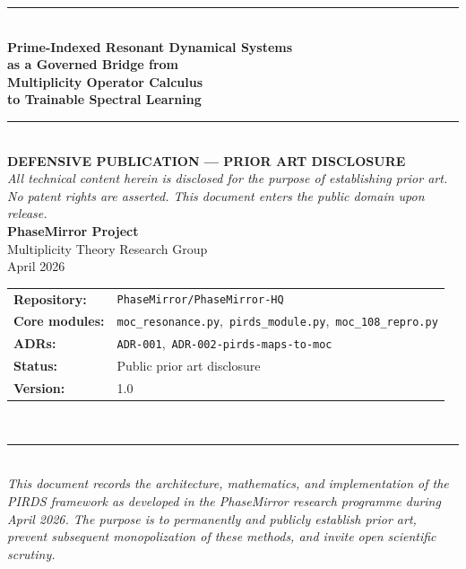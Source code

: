 \documentclass[11pt,a4paper]{article}
\theoremstyle{plain}
\theoremstyle{definition}
\theoremstyle{remark}
\begin{document}

\begin{titlepage}
\pagecolor{bg}
\vspace*{2cm}
\begin{center}
  {\color{teal}\rule{0.9\textwidth}{2pt}}\\[1.2em]
  {\fontsize{22}{28}\selectfont\bfseries\color{stone}
    Prime-Indexed Resonant Dynamical Systems\\[0.4em]
    as a Governed Bridge from\\[0.4em]
    Multiplicity Operator Calculus\\[0.4em]
    to Trainable Spectral Learning}\\[1.0em]
  {\color{teal}\rule{0.9\textwidth}{2pt}}\\[2.0em]
  {\large\bfseries\color{muted} DEFENSIVE PUBLICATION --- PRIOR ART DISCLOSURE}\\[0.5em]
  {\normalsize\color{muted}
    \textit{All technical content herein is disclosed for the purpose of establishing prior art.}\\
    \textit{No patent rights are asserted. This document enters the public domain upon release.}}
  \\[2.5em]
  {\large\bfseries\color{stone} PhaseMirror Project}\\[0.3em]
  {\normalsize\color{muted} Multiplicity Theory Research Group}\\[0.3em]
  {\normalsize\color{muted} April 2026}\\[3.5em]
  \begin{tabular}{ll}
    \textbf{Repository:} & \texttt{PhaseMirror/PhaseMirror-HQ}\\[0.3em]
    \textbf{Core modules:} & \texttt{moc\_resonance.py},\ \texttt{pirds\_module.py},\ \texttt{moc\_108\_repro.py}\\[0.3em]
    \textbf{ADRs:} & \texttt{ADR-001},\ \texttt{ADR-002-pirds-maps-to-moc}\\[0.3em]
    \textbf{Status:} & Public prior art disclosure\\[0.3em]
    \textbf{Version:} & 1.0\\
  \end{tabular}
  \\[3.5em]
  {\color{teal}\rule{0.9\textwidth}{0.8pt}}\\[0.8em]
  {\small\color{muted}
    \textit{This document records the architecture, mathematics, and implementation of the\\
    PIRDS framework as developed in the PhaseMirror research programme during\\
    April 2026. The purpose is to permanently and publicly establish prior art,\\
    prevent subsequent monopolization of these methods, and invite open scientific scrutiny.}}
\end{center}
\end{titlepage}
\nopagecolor
\end{document}
